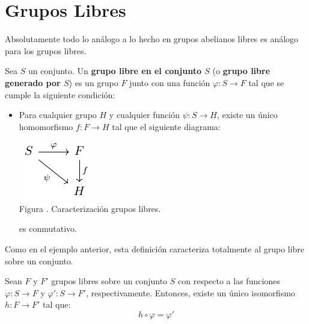 \documentclass[12pt]{report}
\newcounter{it}
\theoremstyle{largebreak}
\newcommand\cf[3]{\ensuremath{#1:#2\rightarrow#3}}
\newcounter{figcount}
\begin{document}
    \section{Grupos Libres}

    Absolutamente todo lo análogo a lo hecho en grupos abelianos libres es análogo para los grupos libres.

    \begin{mydef}
        Sea $S$ un conjunto. Un \textbf{grupo libre en el conjunto $S$} (o \textbf{grupo libre generado por $S$}) es un grupo $F$ junto con una función $\cf{\varphi}{S}{F}$ tal que se cumple la siguiente condición:
        \begin{itemize}
            \item Para cualquier grupo $H$ y cualquier función $\cf{\psi}{S}{H}$, existe un único homomorfismo $\cf{f}{F}{H}$ tal que el siguiente diagrama:
            
            \begin{minipage}{\textwidth}
                \begin{center}
                    \includegraphics[scale=1.5]{images/fig_12.pdf}\\
                    Figura \thefigcount. Caracterización grupos libres.
                \end{center}
            \end{minipage}
            
            es conmutativo.
        \end{itemize}
    \end{mydef}

    Como en el ejemplo anterior, esta definición caracteriza totalmente al grupo libre sobre un conjunto.

    \begin{propo}
        Sean $F$ y $F'$ grupos libres sobre un conjunto $S$ con respecto a las funciones $\cf{\varphi}{S}{F}$ y $\cf{\varphi'}{S}{F'}$, respectivamente. Entonces, existe un único isomorfismo $\cf{h}{F}{F'}$ tal que:
        \begin{equation*}
            h\circ\varphi=\varphi'
        \end{equation*}
    \end{propo}
\end{document}
